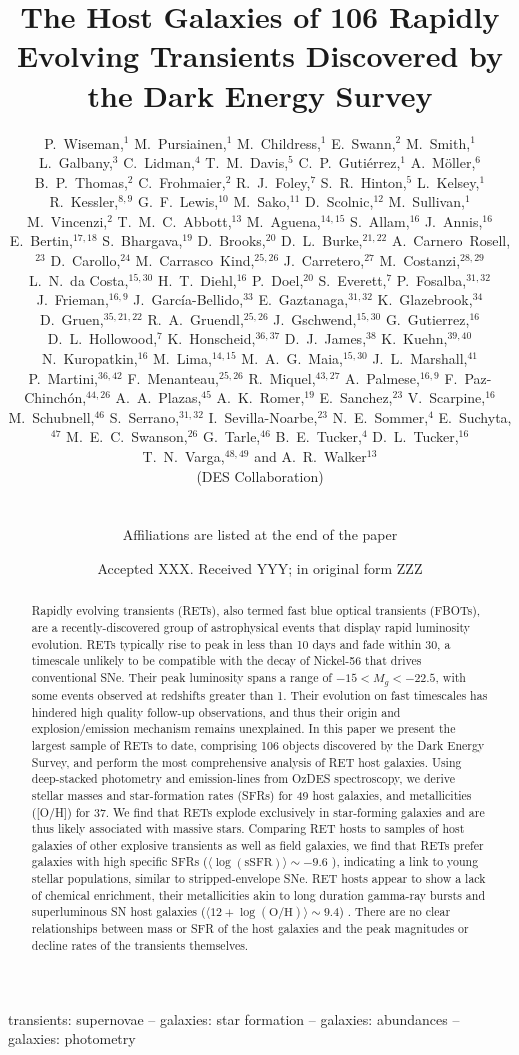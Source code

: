 \documentclass[fleqn,usenatbib,]{mnras}
\title[RET host galaxies in DES]{The Host Galaxies of 106 Rapidly Evolving Transients Discovered by the Dark Energy Survey}
\author[P. S. Wiseman]{
\parbox{\textwidth}{
\Large
P.~Wiseman,$^{1}$
M.~Pursiainen,$^{1}$
M.~Childress,$^{1}$
E.~Swann,$^{2}$
M.~Smith,$^{1}$
L.~Galbany,$^{3}$
C.~Lidman,$^{4}$
T.~M.~Davis,$^{5}$
C.~P.~Guti\'errez,$^{1}$
A.~M\"oller,$^{6}$
B.~P.~Thomas,$^{2}$
C.~Frohmaier,$^{2}$
R.~J.~Foley,$^{7}$
S.~R.~Hinton,$^{5}$
L.~Kelsey,$^{1}$
R.~Kessler,$^{8,9}$
G.~F.~Lewis,$^{10}$
M.~Sako,$^{11}$
D.~Scolnic,$^{12}$
M.~Sullivan,$^{1}$
M.~Vincenzi,$^{2}$
T.~M.~C.~Abbott,$^{13}$
M.~Aguena,$^{14,15}$
S.~Allam,$^{16}$
J.~Annis,$^{16}$
E.~Bertin,$^{17,18}$
S.~Bhargava,$^{19}$
D.~Brooks,$^{20}$
D.~L.~Burke,$^{21,22}$
A.~Carnero~Rosell,$^{23}$
D.~Carollo,$^{24}$
M.~Carrasco~Kind,$^{25,26}$
J.~Carretero,$^{27}$
M.~Costanzi,$^{28,29}$
L.~N.~da Costa,$^{15,30}$
H.~T.~Diehl,$^{16}$
P.~Doel,$^{20}$
S.~Everett,$^{7}$
P.~Fosalba,$^{31,32}$
J.~Frieman,$^{16,9}$
J.~Garc\'ia-Bellido,$^{33}$
E.~Gaztanaga,$^{31,32}$
K.~Glazebrook,$^{34}$
D.~Gruen,$^{35,21,22}$
R.~A.~Gruendl,$^{25,26}$
J.~Gschwend,$^{15,30}$
G.~Gutierrez,$^{16}$
D.~L.~Hollowood,$^{7}$
K.~Honscheid,$^{36,37}$
D.~J.~James,$^{38}$
K.~Kuehn,$^{39,40}$
N.~Kuropatkin,$^{16}$
M.~Lima,$^{14,15}$
M.~A.~G.~Maia,$^{15,30}$
J.~L.~Marshall,$^{41}$
P.~Martini,$^{36,42}$
F.~Menanteau,$^{25,26}$
R.~Miquel,$^{43,27}$
A.~Palmese,$^{16,9}$
F.~Paz-Chinch\'{o}n,$^{44,26}$
A.~A.~Plazas,$^{45}$
A.~K.~Romer,$^{19}$
E.~Sanchez,$^{23}$
V.~Scarpine,$^{16}$
M.~Schubnell,$^{46}$
S.~Serrano,$^{31,32}$
I.~Sevilla-Noarbe,$^{23}$
N.~E.~Sommer,$^{4}$
E.~Suchyta,$^{47}$
M.~E.~C.~Swanson,$^{26}$
G.~Tarle,$^{46}$
B.~E.~Tucker,$^{4}$
D.~L.~Tucker,$^{16}$
T.~N.~Varga,$^{48,49}$
and A.~R.~Walker$^{13}$
\begin{center} (DES Collaboration) \end{center}
}
\vspace{0.4cm}
\\
\parbox{\textwidth}{Affiliations are listed at the end of the paper}
}
\date{Accepted XXX. Received YYY; in original form ZZZ}
\newcommand{\replyref}[1]{\color{magenta}#1 \color{black}}
\begin{document}
\label{firstpage}
\pagerange{\pageref{firstpage}--\pageref{lastpage}}
\maketitle

\begin{abstract}
Rapidly evolving transients (RETs), also termed fast blue optical transients (FBOTs), \replyref{are a recently-discovered group of astrophysical events that display rapid luminosity evolution. RETs typically rise to peak in less than 10 days and fade within 30, a timescale unlikely to be compatible with the decay of Nickel-56 that drives conventional SNe. Their peak luminosity spans a range of $-15 <M_g<-22.5$, with some events observed at redshifts greater than 1.} Their evolution on fast timescales has hindered high quality follow-up observations, and thus their origin and explosion/emission mechanism remains unexplained. In this paper we \replyref{present} the largest sample of RETs to date, comprising 106 objects \replyref{discovered by} the Dark Energy Survey, and perform the most comprehensive analysis of RET host galaxies. Using deep-stacked photometry and emission-lines from OzDES spectroscopy, we derive stellar masses and star-formation rates (SFRs) for 49 host galaxies, and metallicities \replyref{([O/H])} for 37. We find that RETs explode exclusively in star-forming galaxies and are thus likely associated with massive stars. Comparing RET hosts to samples of host galaxies of other explosive transients as well as field galaxies, we find that RETs prefer galaxies with high specific SFRs \replyref{($\langle\log \left(\mathrm{sSFR}\right)\rangle \sim -9.6$ ),} indicating a link to young stellar populations, similar to stripped-envelope SNe. RET hosts appear to show a lack of chemical enrichment, their metallicities akin to long duration gamma-ray bursts and superluminous SN host galaxies \replyref{($\langle12+\log\left(\mathrm{O/H}\right) \rangle \sim 9.4$)}. There are no clear relationships between \replyref{mass or SFR} of the host galaxies and the peak magnitudes or decline rates of the transients themselves.

\end{abstract}

\begin{keywords}
transients: supernovae -- galaxies: star formation -- galaxies: abundances -- galaxies: photometry 
\end{keywords}
\end{document}
